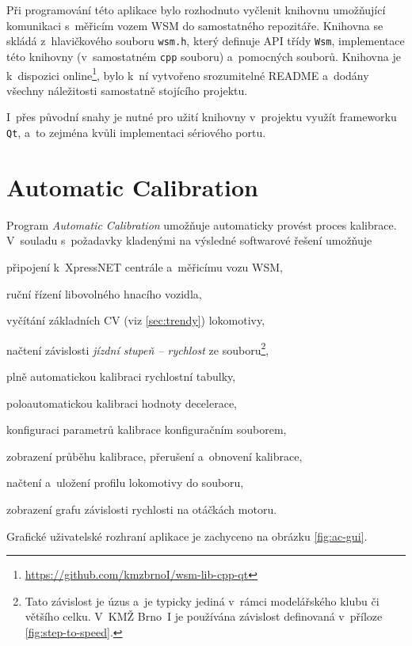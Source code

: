 Při programování této aplikace bylo rozhodnuto vyčlenit knihovnu umožňující
komunikaci s~měřicím vozem \gls{WSM} do samostatného repozitáře. Knihovna se
skládá z~hlavičkového souboru \texttt{wsm.h}, který definuje API třídy
\texttt{Wsm}, implementace této knihovny (v~samostatném \texttt{cpp} souboru)
a~pomocných souborů. Knihovna je k~dispozici
online\footnote{\url{https://github.com/kmzbrnoI/wsm-lib-cpp-qt}}, bylo k~ní
vytvořeno srozumitelné README a~dodány všechny náležitosti samostatně stojícího
projektu.

I~přes původní snahy je nutné pro užití knihovny v~projektu využít frameworku
\texttt{Qt}, a~to zejména kvůli implementaci sériového portu.


\newpage
\section{Automatic Calibration}
\label{sec:sw-wsm-auto-calib}

Program \textit{Automatic Calibration} umožňuje automaticky provést proces
kalibrace. V~souladu s~požadavky kladenými na výsledné softwarové řešení
umožňuje

\begin{compactitem}
\item připojení k~XpressNET centrále a~měřicímu vozu \gls{WSM},
\item ruční řízení libovolného hnacího vozidla,
\item vyčítání základních \gls{CV} (viz \ref{sec:trendy}) lokomotivy,
\item načtení závislosti \textit{jízdní stupeň -- rychlost} ze
souboru\footnote{Tato závislost je úzus a~je typicky jediná v~rámci
modelářského klubu či většího celku. V~KMŽ Brno~I je používána závislost
definovaná v~příloze \ref{fig:step-to-speed}.},
\item plně automatickou kalibraci rychlostní tabulky,
\item poloautomatickou kalibraci hodnoty decelerace,
\item konfiguraci parametrů kalibrace konfiguračním souborem,
\item zobrazení průběhu kalibrace, přerušení a~obnovení kalibrace,
\item načtení a~uložení profilu lokomotivy do souboru,
\item zobrazení grafu závislosti rychlosti na otáčkách motoru.
\end{compactitem}

Grafické uživatelské rozhraní aplikace je zachyceno na obrázku \ref{fig:ac-gui}.

